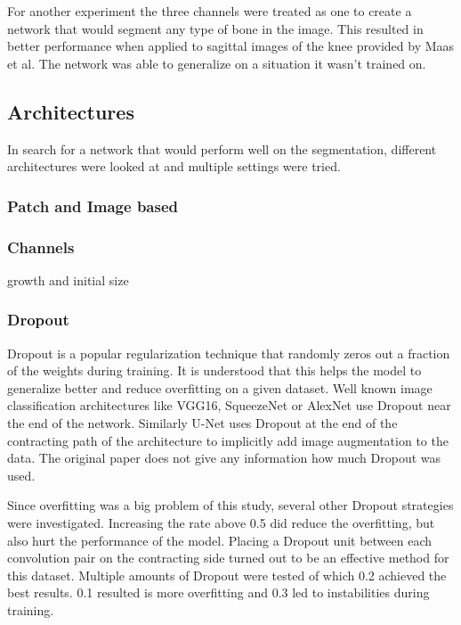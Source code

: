 For another experiment the three channels were treated as one to create a network that would segment any type of bone in the image. This resulted in better performance when applied to sagittal images of the knee provided by Maas et al. The network was able to generalize on a situation it wasn't trained on.

\subsection{Architectures}



In search for a network that would perform well on the segmentation, different architectures were looked at and multiple settings were tried.

\subsubsection{Patch and Image based}




\subsubsection{Channels}

growth and initial size

\subsubsection{Dropout}

Dropout is a popular regularization technique that randomly zeros out a fraction of the weights during training. It is understood that this helps the model to generalize better and reduce overfitting on a given dataset. Well known image classification architectures like VGG16, SqueezeNet or AlexNet use Dropout near the end of the network. Similarly U-Net uses Dropout at the end of the contracting path of the architecture to implicitly add image augmentation to the data. The original paper does not give any information how much Dropout was used.

Since overfitting was a big problem of this study, several other Dropout strategies were investigated. Increasing the rate above 0.5 did reduce the overfitting, but also hurt the performance of the model. Placing a Dropout unit between each convolution pair on the contracting side turned out to be an effective method for this dataset. Multiple amounts of Dropout were tested of which 0.2 achieved the best results. 0.1 resulted is more overfitting and 0.3 led to instabilities during training.

